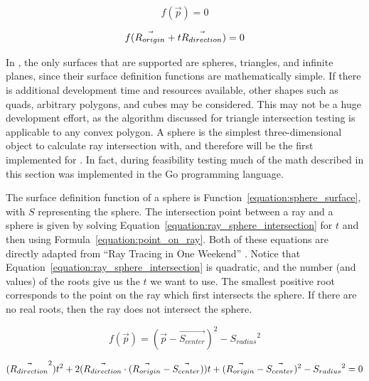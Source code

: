 \begin{equation}
  \label{equation:surface_equation}
  f(\vec{p}) = 0
\end{equation}

\begin{equation}
  \label{equation:ray_surface_intersection}
  f(\vec{R_{origin}} + t\vec{R_{direction}}) = 0
\end{equation}

In \name, the only surfaces that are supported are spheres, triangles, and infinite planes, since their surface definition functions are mathematically simple.
If there is additional development time and resources available, other shapes such as quads, arbitrary polygons, and cubes may be considered.
This may not be a huge development effort, as the algorithm discussed for triangle intersection testing is applicable to any convex polygon.
A sphere is the simplest three-dimensional object to calculate ray intersection with, and therefore will be the first implemented for \name.
In fact, during feasibility testing much of the math described in this section was implemented in the Go programming language.


The surface definition function of a sphere is Function~\ref{equation:sphere_surface}, with $S$ representing the sphere.
The intersection point between a ray and a sphere is given by solving Equation~\ref{equation:ray_sphere_intersection} for $t$ and then using Formula~\ref{equation:point_on_ray}.
Both of these equations are directly adapted from ``Ray Tracing in One Weekend'' \cite{shirley2016ray}.
Notice that Equation~\ref{equation:ray_sphere_intersection} is quadratic, and the number (and values) of the roots give us the $t$ we want to use.
The smallest positive root corresponds to the point on the ray which first intersects the sphere.
If there are no real roots, then the ray does not intersect the sphere.

\begin{equation}
  \label{equation:sphere_surface}
  f(\vec{p}) = (\vec{p} - \vec{S_{center}})^2 - {S_{radius}}^2
\end{equation}

\begin{equation}
  \label{equation:ray_sphere_intersection}
  (\vec{R_{direction}}^2)t^2 + 2(\vec{R_{direction}} \cdot (\vec{R_{origin}} - \vec{S_{center}}))t + (\vec{R_{origin}} - \vec{S_{center}})^2 - {S_{radius}}^2 = 0
\end{equation}



